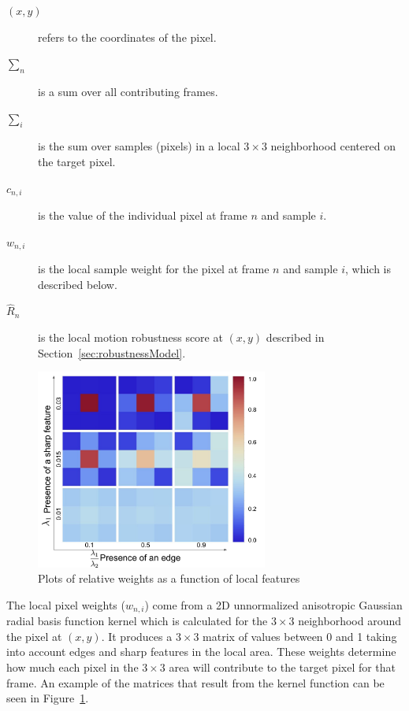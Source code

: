 \documentclass{sig-alternate}
\begin{document}
\begin{description}
  \item[$(x,y)$] refers to the coordinates of the pixel. 
  \item[$\sum_{n}$] is a sum over all contributing frames.
  \item[$\sum_{i}$] is the sum over samples (pixels) in a local $3\times 3$ neighborhood centered on the target pixel.
  \item[$c_{n, i}$] is the value of the individual pixel at frame $n$ and sample $i$.
  \item[$w_{n, i}$] is the local sample weight for the pixel at frame $n$ and sample $i$, which is described below. 
  \item[$\hat{R}_{n}$] is the local motion robustness score at $(x,y)$ described in Section~\ref{sec:robustnessModel}.
\end{description}



\begin{figure}
\centering
\includegraphics[width=3in]{figures/Wronski2019-figure-8.pdf}
\caption{Plots of relative weights as a function of local features~\cite{Wronski2019}}
\label{fig:Wronski2019Fig8}
\end{figure}

The local pixel weights ($w_{n, i}$) come from a 2D unnormalized anisotropic Gaussian radial basis function kernel which is calculated for the $3\times 3$ neighborhood around the pixel at $(x,y)$. It produces a $3\times 3$ matrix of values between 0 and 1 taking into account edges and sharp features in the local area. These weights determine how much each pixel in the $3\times 3$ area will contribute to the target pixel for that frame. An example of the matrices that result from the kernel function can be seen in Figure~\ref{fig:Wronski2019Fig8}.
\end{document}
